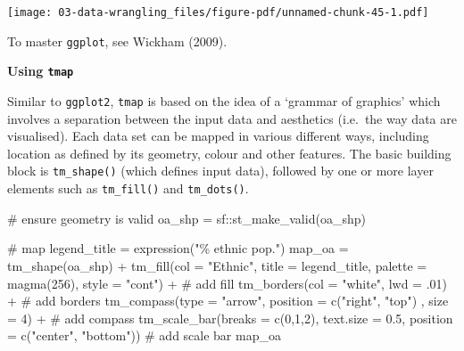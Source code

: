 \documentclass[
  letterpaper,
  DIV=11,
  numbers=noendperiod,
  oneside]{scrreprt}
\newenvironment{Shaded}{\begin{snugshade}}{\end{snugshade}}
\newcommand{\AttributeTok}[1]{\textcolor[rgb]{0.40,0.45,0.13}{#1}}
\newcommand{\CommentTok}[1]{\textcolor[rgb]{0.37,0.37,0.37}{#1}}
\newcommand{\DecValTok}[1]{\textcolor[rgb]{0.68,0.00,0.00}{#1}}
\newcommand{\FloatTok}[1]{\textcolor[rgb]{0.68,0.00,0.00}{#1}}
\newcommand{\FunctionTok}[1]{\textcolor[rgb]{0.28,0.35,0.67}{#1}}
\newcommand{\NormalTok}[1]{\textcolor[rgb]{0.00,0.23,0.31}{#1}}
\newcommand{\OtherTok}[1]{\textcolor[rgb]{0.00,0.23,0.31}{#1}}
\newcommand{\SpecialCharTok}[1]{\textcolor[rgb]{0.37,0.37,0.37}{#1}}
\newcommand{\StringTok}[1]{\textcolor[rgb]{0.13,0.47,0.30}{#1}}
\begin{document}
\texttt{[image: 03-data-wrangling\_files/figure-pdf/unnamed-chunk-45-1.pdf]}

To master \texttt{ggplot}, see Wickham (2009).

\textbf{Using \texttt{tmap}}

Similar to \texttt{ggplot2}, \texttt{tmap} is based on the idea of a
`grammar of graphics' which involves a separation between the input data
and aesthetics (i.e.~the way data are visualised). Each data set can be
mapped in various different ways, including location as defined by its
geometry, colour and other features. The basic building block is
\texttt{tm\_shape()} (which defines input data), followed by one or more
layer elements such as \texttt{tm\_fill()} and \texttt{tm\_dots()}.

\begin{Shaded}
\begin{Highlighting}[]
\CommentTok{\# ensure geometry is valid}
\NormalTok{oa\_shp }\OtherTok{=}\NormalTok{ sf}\SpecialCharTok{::}\FunctionTok{st\_make\_valid}\NormalTok{(oa\_shp)}

\CommentTok{\# map}
\NormalTok{legend\_title }\OtherTok{=} \FunctionTok{expression}\NormalTok{(}\StringTok{"\% ethnic pop."}\NormalTok{)}
\NormalTok{map\_oa }\OtherTok{=} \FunctionTok{tm\_shape}\NormalTok{(oa\_shp) }\SpecialCharTok{+}
  \FunctionTok{tm\_fill}\NormalTok{(}\AttributeTok{col =} \StringTok{"Ethnic"}\NormalTok{, }\AttributeTok{title =}\NormalTok{ legend\_title, }\AttributeTok{palette =} \FunctionTok{magma}\NormalTok{(}\DecValTok{256}\NormalTok{), }\AttributeTok{style =} \StringTok{"cont"}\NormalTok{) }\SpecialCharTok{+} \CommentTok{\# add fill}
  \FunctionTok{tm\_borders}\NormalTok{(}\AttributeTok{col =} \StringTok{"white"}\NormalTok{, }\AttributeTok{lwd =}\NormalTok{ .}\DecValTok{01}\NormalTok{)  }\SpecialCharTok{+} \CommentTok{\# add borders}
  \FunctionTok{tm\_compass}\NormalTok{(}\AttributeTok{type =} \StringTok{"arrow"}\NormalTok{, }\AttributeTok{position =} \FunctionTok{c}\NormalTok{(}\StringTok{"right"}\NormalTok{, }\StringTok{"top"}\NormalTok{) , }\AttributeTok{size =} \DecValTok{4}\NormalTok{) }\SpecialCharTok{+} \CommentTok{\# add compass}
  \FunctionTok{tm\_scale\_bar}\NormalTok{(}\AttributeTok{breaks =} \FunctionTok{c}\NormalTok{(}\DecValTok{0}\NormalTok{,}\DecValTok{1}\NormalTok{,}\DecValTok{2}\NormalTok{), }\AttributeTok{text.size =} \FloatTok{0.5}\NormalTok{, }\AttributeTok{position =}  \FunctionTok{c}\NormalTok{(}\StringTok{"center"}\NormalTok{, }\StringTok{"bottom"}\NormalTok{)) }\CommentTok{\# add scale bar}
\NormalTok{map\_oa}
\end{Highlighting}
\end{Shaded}
\end{document}

